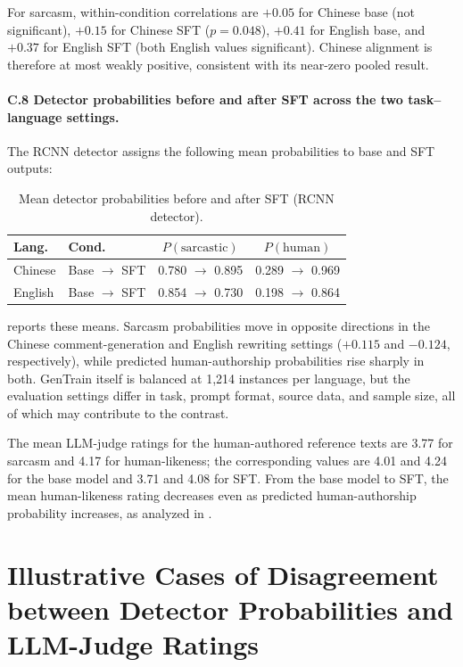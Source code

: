 For sarcasm, within-condition correlations are $+0.05$ for Chinese base (not significant), $+0.15$ for Chinese SFT ($p = 0.048$), $+0.41$ for English base, and $+0.37$ for English SFT (both English values significant). Chinese alignment is therefore at most weakly positive, consistent with its near-zero pooled result.

\label{app:c8}\paragraph{C.8 Detector probabilities before and after SFT across the two task--language settings.} The RCNN detector assigns the following mean probabilities to base and SFT outputs:

\begin{table}[h]
  \centering
  \footnotesize
  \setlength{\tabcolsep}{2pt}
  \begin{tabular}{@{}llcc@{}}
    \toprule
    \textbf{Lang.} & \textbf{Cond.} & \textbf{$P(\text{sarcastic})$} & \textbf{$P(\text{human})$} \\
    \midrule
    Chinese & Base $\to$ SFT & 0.780 $\to$ 0.895 & 0.289 $\to$ 0.969 \\
    English & Base $\to$ SFT & 0.854 $\to$ 0.730 & 0.198 $\to$ 0.864 \\
    \bottomrule
  \end{tabular}
  \caption{Mean detector probabilities before and after SFT (RCNN detector).}
  \label{tab:sft-scores}
\end{table}

 reports these means. Sarcasm probabilities move in opposite directions in the Chinese comment-generation and English rewriting settings ($+0.115$ and $-0.124$, respectively), while predicted human-authorship probabilities rise sharply in both. GenTrain itself is balanced at 1{,}214 instances per language, but the evaluation settings differ in task, prompt format, source data, and sample size, all of which may contribute to the contrast.

The mean LLM-judge ratings for the human-authored reference texts are 3.77 for sarcasm and 4.17 for human-likeness; the corresponding values are 4.01 and 4.24 for the base model and 3.71 and 4.08 for SFT. From the base model to SFT, the mean human-likeness rating decreases even as predicted human-authorship probability increases, as analyzed in .

\section{Illustrative Cases of Disagreement between Detector Probabilities and LLM-Judge Ratings}
\label{app:cases}

